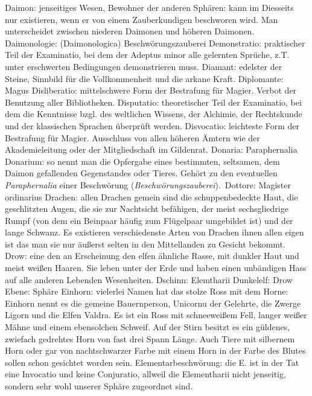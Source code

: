 \documentclass[a5paper,8pt]{book}
\begin{document}
Daimon: jenseitiges Wesen, Bewohner der anderen Sphären: kann im Diesseits nur existieren, wenn er von einem Zauberkundigen 
beschworen wird. Man unterscheidet zwischen \textit{}niederen Daimonen und \textit{}höheren Daimonen.
Daimonologie: (Daimonologica) \textit{}Beschwörungszauberei
Demonstratio: praktischer Teil der \textit{}Examinatio, bei dem der \textit{}Adeptus minor alle gelernten Sprüche, z.T. unter erschwerten Bedingungen demonstrieren muss.
Diamant: edelster der Steine, Sinnbild für die Vollkommenheit und die arkane Kraft. 
Diplomante: \textit{}Magus
Disliberatio: mittelschwere Form der Bestrafung für Magier. Verbot der Benutzung aller Bibliotheken.
Disputatio: theoretischer Teil der \textit{}Examinatio, bei dem die Kenntnisse bzgl. des weltlichen Wissens, der \textit{}Alchimie, der Rechtskunde und der klassischen Sprachen überprüft werden.
Disvocatio: leichteste Form der Bestrafung für Magier. Ausschluss von allen höheren Ämtern wie der Akademieleitung oder der Mitgliedschaft im Gildenrat.
Donaria: \textit{}Paraphernalia
Donarium: so nennt man die Opfergabe eines bestimmten, seltsamen, dem \textit{}Daimon gefallenden Gegenstandes oder 
Tieres. Gehört zu den eventuellen \textit{Paraphernalia} einer Beschwörung (\textit{Beschwörungs­zauberei}).\
Dottore: \textit{}Magister ordinarius
Drachen: allen Drachen gemein sind die schuppenbedeckte Haut, die geschlitzten Augen, die sie zur Nachtsicht befähigen, der meist sechsgliedrige Rumpf (von dem ein Beinpaar häufig zum Flügelpaar umgebildet ist) und der lange Schwanz. Es existieren verschiedenste Arten von Drachen ihnen allen eigen ist das man sie nur äußerst selten in den Mittellanden zu Gesicht bekommt. 
Drow: eine den an Erscheinung den elfen ähnliche Rasse, mit dunkler Haut und meist weißen Haaren. Sie leben unter der Erde und haben einen unbändigen Hass auf alle anderen Lebenden Wesenheiten.
Dschinn: \textit{}Elemtharii
Dunkelelf: \textit{}Drow
Ebene: \textit{}Sphäre
Einhorn: vielerlei Namen hat das stolze Ross mit dem Horne: Einhorn nennt es die gemeine Bauernperson, Unicornu der Gelehrte, die Zwerge Ligorn und die Elfen Valdra. Es ist ein Ross mit schneeweißem Fell, langer weißer Mähne und einem ebensolchen Schweif. Auf der Stirn besitzt es ein güldenes, zwiefach gedrehtes Horn von fast drei Spann Länge. Auch Tiere mit silbernem Horn oder gar von nachtschwarzer Farbe mit einem Horn in der Farbe des Blutes sollen schon gesichtet worden sein.
Elementarbeschwörung: die E. ist in der Tat eine \textit{}Invocatio und keine \textit{}Conjuratio, allweil die \textit{}Elementharii nicht jenseitig, sondern sehr wohl unserer Sphäre zugeordnet sind. 
\end{document}
